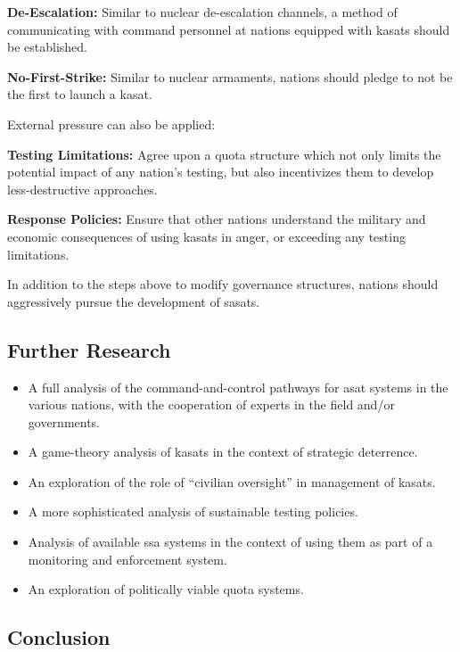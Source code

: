 \textbf{De-Escalation:} Similar to nuclear de-escalation channels, a
method of communicating with command personnel at nations equipped
with \acp{kasat} should be established.

\textbf{No-First-Strike:} Similar to nuclear armaments, nations should
pledge to not be the first to launch a \ac{kasat}.

\noindent External pressure can also be applied:

\textbf{Testing Limitations:} Agree upon a quota structure which not
only limits the potential impact of any nation's testing, but also
incentivizes them to develop less-destructive approaches.

\textbf{Response Policies:} Ensure that other nations understand the
military and economic consequences of using \acp{kasat} in anger, or
exceeding any testing limitations.

In addition to the steps above to modify governance structures,
nations should aggressively pursue the development of \acp{sasat}.


\subsection{Further Research}

\begin{itemize}

\item A full analysis of the command-and-control pathways for asat
  systems in the various nations, with the cooperation of experts in
  the field and/or governments.

\item A game-theory analysis of \acp{kasat} in the context of
  strategic deterrence.

\item An exploration of the role of ``civilian oversight'' in
  management of \acp{kasat}.

\item A more sophisticated analysis of sustainable testing policies.

\item Analysis of available \ac{ssa} systems in the context of using
  them as part of a monitoring and enforcement system.

\item An exploration of politically viable quota systems.

\end{itemize}


\subsection{Conclusion}

